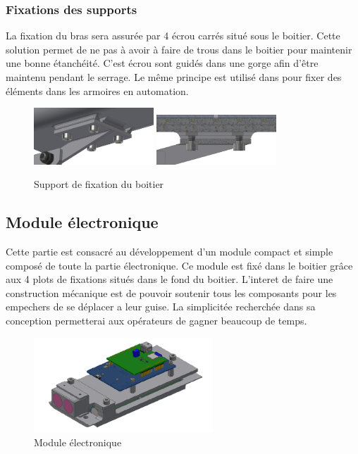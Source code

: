 \subsubsection{Fixations des supports}

La fixation du bras sera assurée par 4 écrou carrés situé sous le boitier. Cette solution permet de 
ne pas à avoir à faire de trous dans le boitier pour maintenir une bonne étanchéité. C’est écrou sont 
guidés dans une gorge afin d’être maintenu pendant le serrage. Le même principe est utilisé dans pour 
fixer des éléments dans les armoires en automation.

\begin{figure}[H]
    \centering
    \includegraphics[width=0.4\textwidth]{Images/photos_PGA/fixdessous2.PNG}
    \includegraphics[width=0.4\textwidth]{Images/photos_PGA/écroucarré.PNG}
    \caption{Support de fixation du boitier}
    \label{fig:supportfix}
\end{figure}

\subsection{Module électronique}

Cette partie est consacré au développement d’un module compact et simple composé de toute la partie 
électronique. Ce module est fixé dans le boitier grâce aux 4 plots de fixations situés dans le fond 
du boitier. L’interet de faire une construction mécanique est de pouvoir soutenir tous les composants 
pour les empechers de se déplacer a leur guise. La simplicitée recherchée dans sa conception permetterai 
aux opérateurs de gagner beaucoup de temps.

\begin{figure}[H]
    \centering
    \includegraphics[width=0.6\textwidth]{Images/photos_PGA/ModuleElec2-removebg-preview.png}
    \caption{Module électronique}
    \label{fig:elmodule}
\end{figure}

